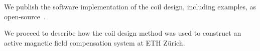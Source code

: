 We publish the software implementation of the coil design, including examples, as open-source~\cite{Coilsjlcode}.

We proceed to describe how the coil design method was used to construct an active magnetic field compensation system at ETH Zürich.



  

















